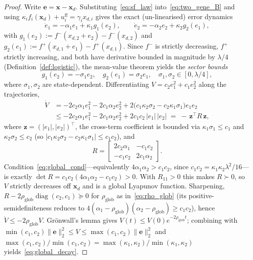 \documentclass[12pt]{article}
\begin{document}
\begin{proof}
Write $\mathbf{e}=\mathbf{x}-\mathbf{x}_d$. Substituting~\eqref{eq:sf_law}
into~\eqref{eq:two_gene_B} and using
$\kappa_i f_i(\mathbf{x}_d)+u_i^{\mathrm{ff}}=\gamma_i x_{d,i}$ gives the
exact (un-linearised) error dynamics
\[
\dot e_1 = -\alpha_1 e_1 + \kappa_1 g_1(e_2),\qquad
\dot e_2 = -\alpha_2 e_2 + \kappa_2 g_2(e_1),
\]
with $g_1(e_2):=f^-(x_{d,2}+e_2)-f^-(x_{d,2})$ and
$g_2(e_1):=f^+(x_{d,1}+e_1)-f^+(x_{d,1})$. Since $f^-$ is strictly
decreasing, $f^+$ strictly increasing, and both have derivative bounded
in magnitude by $\lambda/4$ (Definition~\ref{def:logistic}), the
mean-value theorem yields the \emph{sector bounds}
\[
g_1(e_2)=-\sigma_1 e_2,\quad g_2(e_1)=\sigma_2 e_1,\quad
\sigma_1,\sigma_2\in[0,\lambda/4],
\]
where $\sigma_1,\sigma_2$ are state-dependent. Differentiating
$V=c_2 e_1^2+c_1 e_2^2$ along the trajectories,
\begin{align*}
\dot V &= -2c_2\alpha_1 e_1^2 - 2c_1\alpha_2 e_2^2
        + 2\bigl(c_1\kappa_2\sigma_2 - c_2\kappa_1\sigma_1\bigr)e_1 e_2\\
       &\le -2c_2\alpha_1 e_1^2 - 2c_1\alpha_2 e_2^2 + 2c_1c_2\,|e_1|\,|e_2|
        \;=\; -\,\mathbf{z}^{\!\top} R\,\mathbf{z},
\end{align*}
where $\mathbf{z}=(|e_1|,|e_2|)^{\!\top}$, the cross-term coefficient is
bounded via $\kappa_1\sigma_1\le c_1$ and $\kappa_2\sigma_2\le c_2$ (so
$|c_1\kappa_2\sigma_2-c_2\kappa_1\sigma_1|\le c_1c_2$), and
\[
R=\begin{bmatrix} 2c_2\alpha_1 & -c_1c_2\\[2pt] -c_1c_2 & 2c_1\alpha_2\end{bmatrix}.
\]
Condition~\eqref{eq:global_cond}---equivalently $4\alpha_1\alpha_2>c_1c_2$,
since $c_1c_2=\kappa_1\kappa_2\lambda^2/16$---is exactly
$\det R=c_1c_2(4\alpha_1\alpha_2-c_1c_2)>0$. With $R_{11}>0$ this makes
$R\succ0$, so $V$ strictly decreases off $\mathbf{x}_d$ and is a global
Lyapunov function. Sharpening, $R-2\rho_{\mathrm{glob}}\operatorname{diag}(c_2,c_1)
\succeq0$ for $\rho_{\mathrm{glob}}$ as in~\eqref{eq:rho_glob} (its
positive-semidefiniteness reduces to
$4(\alpha_1-\rho_{\mathrm{glob}})(\alpha_2-\rho_{\mathrm{glob}})\ge c_1c_2$),
hence $\dot V\le-2\rho_{\mathrm{glob}}V$. Gr\"onwall's lemma gives
$V(t)\le V(0)e^{-2\rho_{\mathrm{glob}}t}$; combining with
$\min(c_1,c_2)\|\mathbf{e}\|_2^2\le V\le\max(c_1,c_2)\|\mathbf{e}\|_2^2$
and $\max(c_1,c_2)/\min(c_1,c_2)=\max(\kappa_1,\kappa_2)/\min(\kappa_1,\kappa_2)$
yields~\eqref{eq:global_decay}.
\end{proof}
\end{document}
